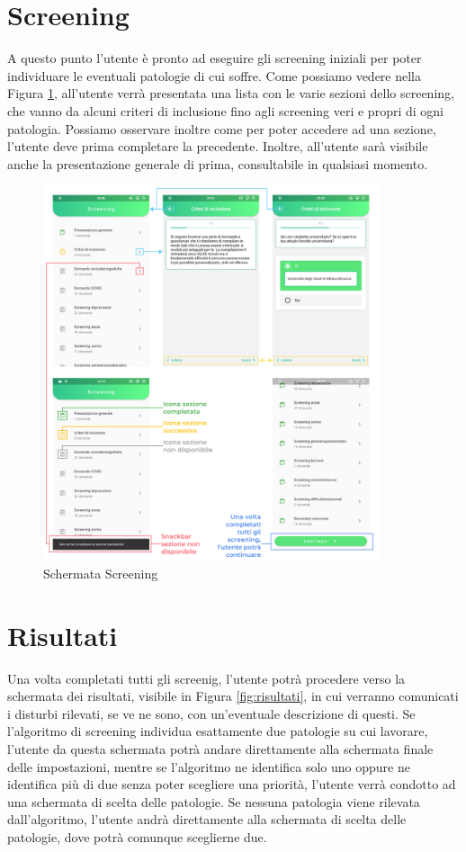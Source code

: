 \newpage
\section{Screening}
\label{section:screening}
A questo punto l'utente è pronto ad eseguire gli screening iniziali per poter individuare le eventuali patologie di cui soffre. Come possiamo vedere nella Figura \ref{fig:screening}, all'utente verrà presentata una lista con le varie sezioni dello screening, che vanno da alcuni criteri di inclusione fino agli screening veri e propri di ogni patologia. Possiamo osservare inoltre come per poter accedere ad una sezione, l'utente deve prima completare la precedente. Inoltre, all'utente sarà visibile anche la presentazione generale di prima, consultabile in qualsiasi momento.

\begin{figure}[h!]
\centering
\includegraphics[width=0.88\textwidth]{img/screening}
\caption{Schermata Screening}
\label{fig:screening}
\end{figure}

\section{Risultati}
Una volta completati tutti gli screenig, l'utente potrà procedere verso la schermata dei risultati, visibile in Figura \ref{fig:risultati}, in cui verranno comunicati i disturbi rilevati, se ve ne sono, con un'eventuale descrizione di questi. Se l'algoritmo di screening individua esattamente due patologie su cui lavorare, l'utente da questa schermata potrà andare direttamente alla schermata finale delle impostazioni, mentre se l'algoritmo ne identifica solo uno oppure ne identifica più di due senza poter scegliere una priorità, l'utente verrà condotto ad una schermata di scelta delle patologie. Se nessuna patologia viene rilevata dall'algoritmo, l'utente andrà direttamente alla schermata di scelta delle patologie, dove potrà comunque sceglierne due.

